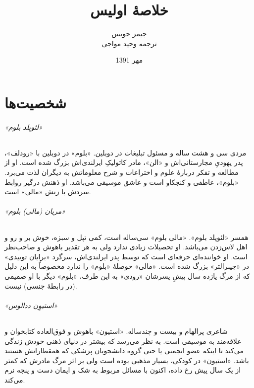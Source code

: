 \documentclass[12pt]{book}
\newcommand{\noun}[1]{«{#1}»}
\begin{document}
    \title{خلاصۀ اولیس }
    \author{جیمز جویس\\
    ترجمه وحید مواجی
    }
    \date{مهر 1391}
    \frontmatter                            %
    \maketitle                              %
    \tableofcontents                        %
    \mainmatter


    \part{شخصیت‌ها}
    \paragraph{\noun{لئوپلد بلوم}\protect{}}
    مردی سی و هشت ساله و مسئول تبلیغات در دوبلین. \noun{بلوم} در دوبلین با \noun{رودلف}، پدر یهودیِ مجارستانی‌اش‌ و \noun{الن}، مادر کاتولیکِ ایرلندی‌اش بزرگ شده است. او از مطالعه و تفکر دربارۀ علوم و اختراعات و شرح معلوماتش به دیگران لذت می‌برد. \noun{بلوم}، عاطفی و کنجکاو است و عاشق موسیقی می‌باشد. او ذهنش درگیر روابط سردش با زنش \noun{مالی} است.
    \paragraph{\noun{مریان (مالی) بلوم}\protect{}}
    همسر \noun{لئوپلد بلوم}. \noun{‫مالی بلوم‬} سی‌ساله است، کمی تپل و سبزه، خوش بر و رو و اهل لاس‌زدن می‌باشد. او تحصیلات زیادی ندارد ولی به هر تقدیر باهوش و صاحب‌نظر است. او خواننده‌ای حرفه‌ای است که توسط پدر ایرلندی‌اش، سرگرد \noun{برایان توییدی} در \noun{جیبرالتر} بزرگ شده است. \noun{مالی} حوصلۀ \noun{بلوم} را ندارد مخصوصاً به این دلیل که از مرگ یازده سال پیشِ پسرشان \noun{رودی} به این طرف، \noun{بلوم} دیگر با او صمیمی (در رابطۀ جنسی) نیست.
    \paragraph{\noun{استیوِن ددالوس}\protect{}}
    شاعری پرالهام و بیست و چندساله. \noun{استیون} باهوش و فوق‌العاده کتابخوان و علاقه‌مند به موسیقی است. به نظر می‌رسد که بیشتر در دنیای ذهنی خودش زندگی می‌کند تا اینکه عضو انجمنی یا حتی گروه دانشجویان پزشکی که همقطارانش هستند باشد. \noun{استیون} در کودکی، بسیار مذهبی بوده است ولی بر اثر مرگ مادرش که کمتر از یک سال پیش رخ داده، اکنون با مسائل مربوط به شک و ایمان دست و پنجه نرم می‌کند.
\end{document}
